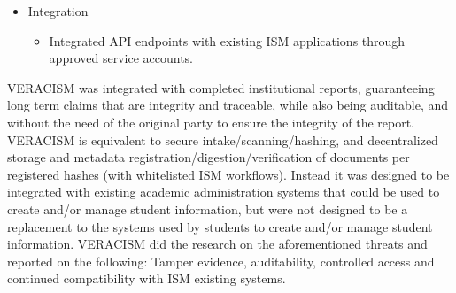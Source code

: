 \begin{itemize}
            \item Integration
                \begin{itemize}
                    \item Integrated API endpoints with existing ISM applications through approved service accounts.
                \end{itemize}

        \end{itemize}


VERACISM was integrated with completed institutional reports, guaranteeing long term claims that are integrity and traceable, while also being auditable, and without the need of the original party to ensure the integrity of the report. VERACISM is equivalent to secure intake/scanning/hashing, and decentralized storage and metadata registration/digestion/verification of documents per registered hashes (with whitelisted ISM workflows). Instead it was designed to be integrated with existing academic administration systems that could be used to create and/or manage student information, but were not designed to be a replacement to the systems used by students to create and/or manage student information. VERACISM did the research on the aforementioned threats and reported on the following: Tamper evidence, auditability, controlled access and continued compatibility with ISM existing systems.

